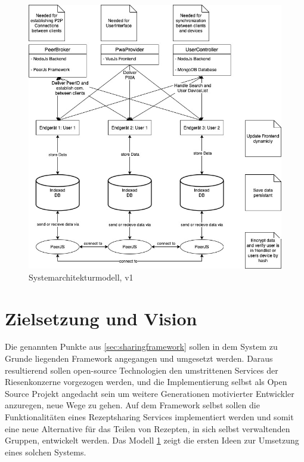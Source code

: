 \documentclass[10pt]{article}
\begin{document}
    \begin{figure}[!h] %
        \includegraphics[width=1\textwidth]{../../Systemarchitektur/PPSS21_Mai_Systemarchitektur.jpg}
        \caption[Die Vision]{Systemarchitekturmodell, v1}
        \label{fig:systemarchitekturmodell}
    \end{figure}
    \section{Zielsetzung und Vision}\label{sec:Zielsetzung}
    Die genannten Punkte aus \ref{sec:sharingframework} sollen in dem System zu Grunde liegenden Framework angegangen und umgesetzt werden. Daraus resultierend sollen open-source Technologien den umstrittenen Services der Riesenkonzerne vorgezogen werden, und die Implementierung selbst als Open Source Projekt angedacht sein um weitere Generationen motivierter Entwickler anzuregen, neue Wege zu gehen.
    Auf dem Framework selbst sollen die Funktionalitäten eines Rezeptsharing Services implementiert werden und somit eine neue Alternative für das Teilen von Rezepten, in sich selbst verwaltenden Gruppen, entwickelt werden.
    Das Modell \ref{fig:systemarchitekturmodell} zeigt die ersten Ideen zur Umsetzung eines solchen Systems.
\end{document}
